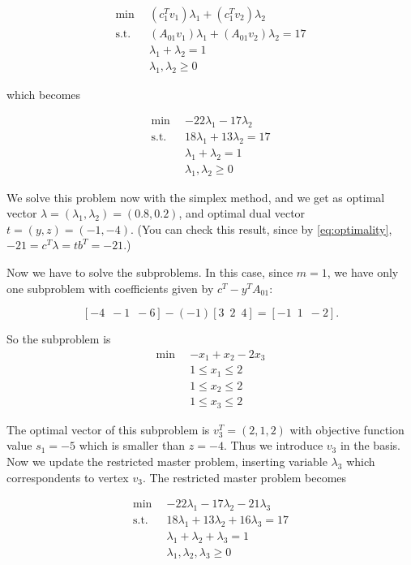 \documentclass[a4paper,12pt]{article}
\begin{document}
\begin{align*}
\min \enspace & (c_{1}^Tv_1)\lambda_1  + (c_{1}^Tv_2)\lambda_2 \\
\text{s.t.} \enspace & (A_{01}v_1)\lambda_1 + (A_{01}v_2)\lambda_2 = 17 \\
& \lambda_1 + \lambda_2 = 1 \\
& \lambda_1 , \lambda_2 \geq 0
\end{align*}


which becomes 


\begin{align*}
\min \enspace & -22\lambda_1  - 17\lambda_2 \\
\text{s.t.} \enspace & 18\lambda_1 + 13\lambda_2 = 17 \\
& \lambda_1 + \lambda_2 = 1 \\
& \lambda_1 , \lambda_2 \geq 0
\end{align*}

We solve this problem now with the simplex method, and we get as optimal vector $\lambda = (\lambda_1, \lambda_2) = (0.8,0.2)$, and optimal dual vector $t = (y,z) = (-1,-4)$. (You can check this result, since by \eqref{eq:optimality}, $-21 = c^T\lambda = tb^T = -21.$)

Now we have to solve the subproblems. In this case, since $m=1$, we have only one subproblem with coefficients given by $c^T - y^TA_{01}:$

\[
[-4 \enspace -1 \enspace -6] - (-1) [3 \enspace 2 \enspace 4] = [-1 \enspace 1 \enspace -2].
\]

So the subproblem is
\begin{align*}
\min \enspace &  -x_1 + x_2 - 2x_3  \\
& 1 \leq x_1  \leq 2 \\ 
& 1 \leq x_2  \leq 2 \\
& 1 \leq x_3  \leq 2 
\end{align*}

The optimal vector of this subproblem is $v_3^T = (2,1,2)$ with objective function value $s_1 = -5$ which is smaller than $z = -4$. Thus we introduce $v_3$ in the basis. Now we update the restricted master problem, inserting variable $\lambda_3$ which correspondents to vertex $v_3$. The restricted master problem becomes

\begin{align*}
\min \enspace & -22\lambda_1  - 17\lambda_2 - 21\lambda_3 \\
\text{s.t.} \enspace & 18\lambda_1 + 13\lambda_2 + 16\lambda_3 = 17 \\
& \lambda_1 + \lambda_2 +\lambda_3 = 1 \\
& \lambda_1 , \lambda_2, \lambda_3 \geq 0
\end{align*}
\end{document}

